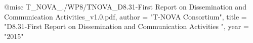@misc{ T_NOVA_./WP8/TNOVA_D8.31-First Report on Dissemination and Communication Activities_v1.0.pdf,
       author = "{T-NOVA Consortium}",
       title = "D8.31-First Report on Dissemination and Communication Activities ",
       year = "2015" }
